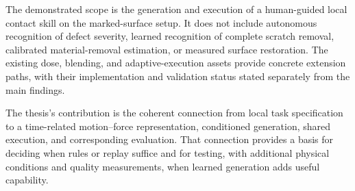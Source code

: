 The demonstrated scope is the generation and execution of a human-guided local contact skill on the marked-surface setup. It does not include autonomous recognition of defect severity, learned recognition of complete scratch removal, calibrated material-removal estimation, or measured surface restoration. The existing dose, blending, and adaptive-execution assets provide concrete extension paths, with their implementation and validation status stated separately from the main findings.

The thesis's contribution is the coherent connection from local task specification to a time-related motion--force representation, conditioned generation, shared execution, and corresponding evaluation. That connection provides a basis for deciding when rules or replay suffice and for testing, with additional physical conditions and quality measurements, when learned generation adds useful capability.

